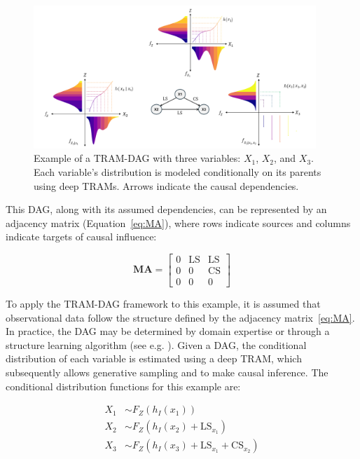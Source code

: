 \begin{figure}[H]
\centering
\includegraphics[width=0.95\textwidth]{img/tram_dag.png}
\caption{Example of a TRAM-DAG with three variables: $X_1$, $X_2$, and $X_3$. Each variable's distribution is modeled conditionally on its parents using deep TRAMs. Arrows indicate the causal dependencies.}
\label{fig:tram_dag}
\end{figure}

This DAG, along with its assumed dependencies, can be represented by an adjacency matrix (Equation~\ref{eq:MA}), where rows indicate sources and columns indicate targets of causal influence:


\begin{equation}
\mathbf{MA} =
\begin{bmatrix}
  0 & \text{LS} & \text{LS} \\
  0 & 0  & \text{CS} \\
  0 & 0  & 0
\end{bmatrix}
\label{eq:MA}
\end{equation}

To apply the TRAM-DAG framework to this example, it is assumed that observational data follow the structure defined by the adjacency matrix~\ref{eq:MA}. In practice, the DAG may be determined by domain expertise or through a structure learning algorithm (see e.g. \citealp{zheng2018}). Given a DAG, the conditional distribution of each variable is estimated using a deep TRAM, which subsequently allows generative sampling and to make causal inference. The conditional distribution functions for this example are:

\[
\begin{aligned}
X_1 &\sim F_Z(h_I(x_1)) \\
X_2 &\sim F_Z(h_I(x_2) + \mathrm{LS}_{x_1}) \\
X_3 &\sim F_Z(h_I(x_3) + \mathrm{LS}_{x_1} + \mathrm{CS}_{x_2})
\end{aligned}
\]


